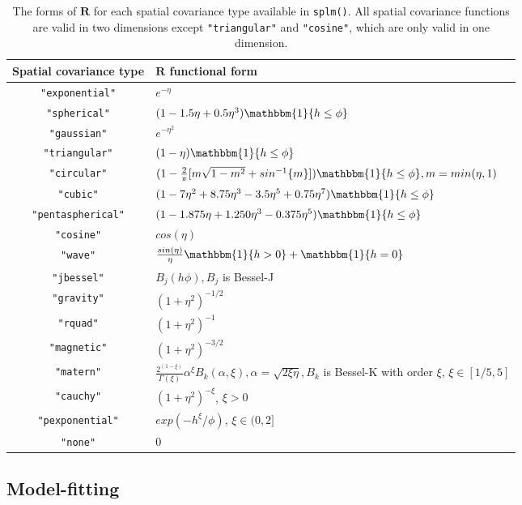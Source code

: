 \documentclass{article}
\begin{document}
\begin{table}
  \centering
  \begin{tabular}{c|l}
  \hline
  Spatial covariance type & $\mathbf{R}$ functional form \\
  \hline
  \texttt{"exponential"} & $e^{-\eta}$ \\
  \texttt{"spherical"} & $(1 - 1.5\eta + 0.5\eta^3)\mathbbm{1}\{h \leq \phi \}$ \\
  \texttt{"gaussian"} & $e^{-\eta^2}$ \\
  \texttt{"triangular"} & $(1 - \eta)\mathbbm{1}\{h \leq \phi \}$ \\
  \texttt{"circular"} & $(1 - \frac{2}{\pi}[m\sqrt{1 - m^2} + sin^{-1}\{m\}])\mathbbm{1}\{h \leq \phi \}, m = min(\eta, 1)$ \\
  \texttt{"cubic"} & $(1 - 7\eta^2 + 8.75\eta^3 - 3.5\eta^5 + 0.75 \eta^7)\mathbbm{1}\{h \leq \phi \}$ \\
  \texttt{"pentaspherical"} & $(1 - 1.875\eta + 1.250\eta^3 - 0.375\eta^5)\mathbbm{1}\{h \leq \phi \}$ \\
  \texttt{"cosine"} & $ cos(\eta) $ \\
  \texttt{"wave"} & $\frac{sin(\eta)}{\eta}\mathbbm{1}\{h > 0 \} + \mathbbm{1}\{h = 0 \}$ \\
  \texttt{"jbessel"} & $B_j(h\phi), B_j$ is Bessel-J \\
  \texttt{"gravity"} & $(1 + \eta^2)^{-1/2}$ \\
  \texttt{"rquad"} & $(1 + \eta^2)^{-1}$ \\
  \texttt{"magnetic"} & $(1 + \eta^2)^{-3/2}$ \\
  \texttt{"matern"} & $\frac{2^{(1 - \xi)}}{\Gamma(\xi)} \alpha^\xi B_k(\alpha, \xi), \alpha = \sqrt{2\xi \eta}, B_k$ is Bessel-K with order $\xi$, $\xi \in [1/5, 5]$ \\
  \texttt{"cauchy"} & $(1 + \eta^2)^{-\xi}$, $\xi > 0$ \\
  \texttt{"pexponential"} & $exp(-h^\xi / \phi)$, $\xi \in (0, 2]$ \\
  \texttt{"none"} & $0$ \\
  \hline
  \end{tabular}
  \caption{The forms of $\mathbf{R}$ for each spatial covariance type available in \texttt{splm()}. All spatial covariance functions are valid in two dimensions except \texttt{"triangular"} and \texttt{"cosine"}, which are only valid in one dimension.}
  \label{tab:cov_splm}
\end{table}

\hypertarget{subsec:estimation}{%
\subsection{Model-fitting}\label{subsec:estimation}}
\end{document}
